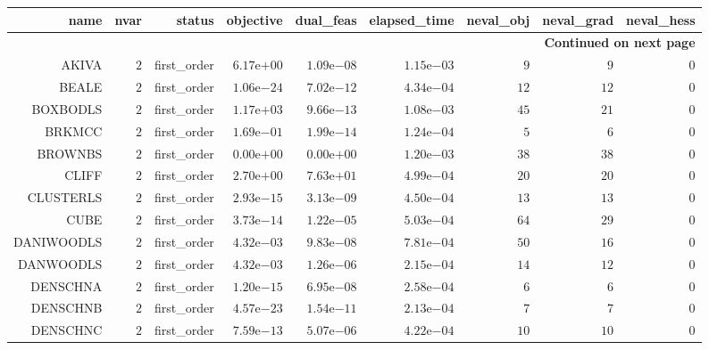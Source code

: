 \begin{longtable}{rrrrrrrrr}
\hline
name & nvar & status & objective & dual\_feas & elapsed\_time & neval\_obj & neval\_grad & neval\_hess \\\hline
\endhead
\hline
\multicolumn{9}{r}{{\bfseries Continued on next page}}\\
\hline
\endfoot
\endlastfoot
AKIVA & \(     2\) & first\_order & \( 6.17\)e\(+00\) & \( 1.09\)e\(-08\) & \( 1.15\)e\(-03\) & \(     9\) & \(     9\) & \(     0\) \\
BEALE & \(     2\) & first\_order & \( 1.06\)e\(-24\) & \( 7.02\)e\(-12\) & \( 4.34\)e\(-04\) & \(    12\) & \(    12\) & \(     0\) \\
BOXBODLS & \(     2\) & first\_order & \( 1.17\)e\(+03\) & \( 9.66\)e\(-13\) & \( 1.08\)e\(-03\) & \(    45\) & \(    21\) & \(     0\) \\
BRKMCC & \(     2\) & first\_order & \( 1.69\)e\(-01\) & \( 1.99\)e\(-14\) & \( 1.24\)e\(-04\) & \(     5\) & \(     6\) & \(     0\) \\
BROWNBS & \(     2\) & first\_order & \( 0.00\)e\(+00\) & \( 0.00\)e\(+00\) & \( 1.20\)e\(-03\) & \(    38\) & \(    38\) & \(     0\) \\
CLIFF & \(     2\) & first\_order & \( 2.70\)e\(+00\) & \( 7.63\)e\(+01\) & \( 4.99\)e\(-04\) & \(    20\) & \(    20\) & \(     0\) \\
CLUSTERLS & \(     2\) & first\_order & \( 2.93\)e\(-15\) & \( 3.13\)e\(-09\) & \( 4.50\)e\(-04\) & \(    13\) & \(    13\) & \(     0\) \\
CUBE & \(     2\) & first\_order & \( 3.73\)e\(-14\) & \( 1.22\)e\(-05\) & \( 5.03\)e\(-04\) & \(    64\) & \(    29\) & \(     0\) \\
DANIWOODLS & \(     2\) & first\_order & \( 4.32\)e\(-03\) & \( 9.83\)e\(-08\) & \( 7.81\)e\(-04\) & \(    50\) & \(    16\) & \(     0\) \\
DANWOODLS & \(     2\) & first\_order & \( 4.32\)e\(-03\) & \( 1.26\)e\(-06\) & \( 2.15\)e\(-04\) & \(    14\) & \(    12\) & \(     0\) \\
DENSCHNA & \(     2\) & first\_order & \( 1.20\)e\(-15\) & \( 6.95\)e\(-08\) & \( 2.58\)e\(-04\) & \(     6\) & \(     6\) & \(     0\) \\
DENSCHNB & \(     2\) & first\_order & \( 4.57\)e\(-23\) & \( 1.54\)e\(-11\) & \( 2.13\)e\(-04\) & \(     7\) & \(     7\) & \(     0\) \\
DENSCHNC & \(     2\) & first\_order & \( 7.59\)e\(-13\) & \( 5.07\)e\(-06\) & \( 4.22\)e\(-04\) & \(    10\) & \(    10\) & \(     0\) \\

\end{longtable}
